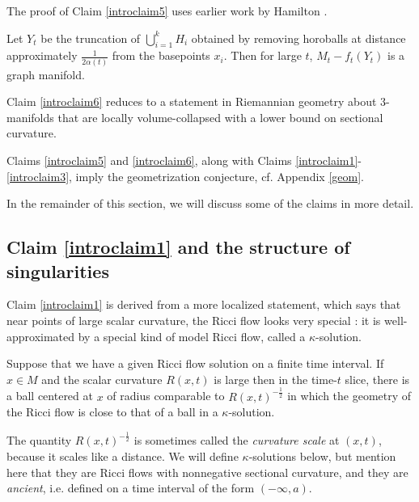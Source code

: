 The proof of Claim \ref{introclaim5} uses earlier work by
Hamilton \cite{Hamiltonn}.

\begin{proposition}
  \label{prop:kl-overview-ricci-flow-approach-manifold-geometrization-graph-manifolds-proposition}
 \cite{Perelman2,Shioya-Yamaguchi} \label{introclaim6}
Let $Y_t$ be the truncation of $\bigcup_{i=1}^k H_i$ obtained by
removing horoballs at distance approximately $\frac{1}{2 \alpha(t)}$
from the basepoints $x_i$. Then for large $t$, $M_t - f_t(Y_t)$ is
a graph manifold.
\end{proposition}

Claim \ref{introclaim6} reduces to a statement in Riemannian geometry
about $3$-manifolds that are locally volume-collapsed with a lower
bound on sectional curvature.

Claims \ref{introclaim5} and \ref{introclaim6}, along with Claims
\ref{introclaim1}-\ref{introclaim3}, imply the geometrization conjecture,
cf. Appendix \ref{geom}.

In the remainder of this section, we will discuss some of the claims in
more detail.


\subsection{Claim \ref{introclaim1} and the structure of singularities}
Claim \ref{introclaim1} is derived from a more localized statement, which
says that near points of large scalar curvature, the Ricci flow looks
very special : it is well-approximated by a special kind of
model Ricci flow, called a $\kappa$-solution.

\begin{proposition}
  \label{prop:kl-overview-ricci-flow-approach-manifold-geometrization-existence-kappa-solutions}

\label{introclaim7}
Suppose that we have a given Ricci flow solution on a finite time interval.
If $x\in M$ and the scalar curvature $R(x,t)$ is large then
in the time-$t$ slice,
there is a ball  centered at $x$
of radius comparable to $R(x,t)^{-\frac12}$ in which the geometry
of the Ricci flow
is close to that of a ball in a $\kappa$-solution.
\end{proposition}
The quantity $R(x,t)^{-\frac12}$ is sometimes called the {\em curvature scale}
at $(x,t)$, because it scales like a distance.  We will  define $\kappa$-solutions
below, but mention here that they are Ricci flows with nonnegative sectional curvature,
and they are {\em ancient}, i.e. defined on a time interval of the form
$(-\infty,a)$.

